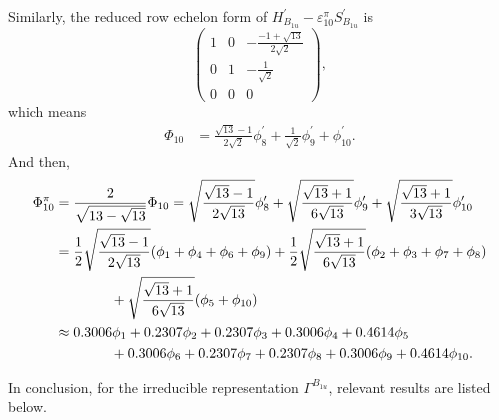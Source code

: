 \documentclass[a4paper]{book}
\newcommand{\Hp}{H^\prime}
\newcommand{\Sp}{S^\prime}
\begin{document}
\begin{solution}
\begin{enumerate}[label=(\alph*)]
		Similarly, the reduced row echelon form of $\Hp_{B_{1u}}-\varepsilon^\pi_{10} \Sp_{B_{1u}}$ is
		\begin{equation*}
			\begin{pmatrix}
				1	& 0	&	-\frac{-1+\sqrt{13}}{2\sqrt{2}}	\\	0	&	1	&	-\frac{1}{\sqrt{2}}	\\	0	&	0	&	0
			\end{pmatrix},
		\end{equation*}		
		which means
		\begin{align*}
			\Phi_{10} &= \frac{\sqrt{13}-1}{2\sqrt{2}}\phi^\prime_8 + \frac{1}{\sqrt{2}} \phi^\prime_9 + \phi^\prime_{10}.
		\end{align*}
		And then,
		\begin{align}
			\Phi^\pi_{10} &= \frac{2}{\sqrt{13-\sqrt{13}}} \Phi_{10} = \sqrt{\frac{\sqrt{13}-1}{2\sqrt{13}}} \phi^\prime_8 + \sqrt{\frac{\sqrt{13}+1}{6\sqrt{13}}} \phi^\prime_9	+ \sqrt{\frac{\sqrt{13}+1}{3\sqrt{13}}} \phi^\prime_{10}\notag \\
			&= \frac{1}{2}\sqrt{\frac{\sqrt{13}-1}{2\sqrt{13}}}(\phi_1 + \phi_4 + \phi_6 + \phi_9) + \frac{1}{2}\sqrt{\frac{\sqrt{13}+1}{6\sqrt{13}}} (\phi_2 + \phi_3 + \phi_7 + \phi_8) \notag \\
			&\hspace*{4em}+ \sqrt{\frac{\sqrt{13}+1}{6\sqrt{13}}} (\phi_5 +\phi_{10})  \notag \\
			&\approx 0.3006 \phi_1 + 0.2307 \phi_2 +0.2307 \phi_3 +0.3006 \phi_4 + 0.4614 \phi_5 \notag \\
			&\hspace*{4em} + 0.3006\phi_6 +0.2307 \phi_7 + 0.2307 \phi_8 + 0.3006 \phi_9 + 0.4614 \phi_{10}.
		\end{align}

		In conclusion, for the irreducible representation $\Gamma^{B_{1u}}$, relevant results are listed below.
		

\end{enumerate}
\end{solution}
\end{document}

